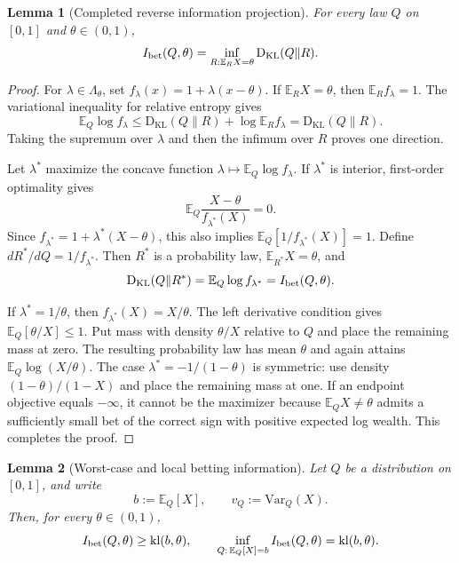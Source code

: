 \documentclass[12pt]{article}
\theoremstyle{spaced}
\newtheorem{lemma}[lemma]{Lemma}
\theoremstyle{remark}
\newcommand{\E}{\mathbb E}
\newcommand{\KL}{\mathrm{D}_{\text{KL}}}
\newcommand{\kl}{\mathrm{kl}}
\begin{document}
\label{app:bounded-UP-information}
\begin{lemma}[Completed reverse information projection]
\label{lem:UP-ripr}
For every law $Q$ on $[0,1]$ and $\theta\in(0,1)$,
\[
 I_{\rm bet}(Q,\theta)
 =\inf_{R:\E_RX=\theta}\KL(Q\|R).
\]
\end{lemma}
\begin{proof}
For $\lambda\in\Lambda_\theta$, set
$f_\lambda(x)=1+\lambda(x-\theta)$.  If $\E_RX=\theta$, then
$\E_Rf_\lambda=1$.  The variational inequality for relative entropy gives
\[
 \E_Q\log f_\lambda
 \le\KL(Q\|R)+\log\E_Rf_\lambda
 =\KL(Q\|R).
\]
Taking the supremum over $\lambda$ and then the infimum over $R$ proves one
direction.

Let $\lambda^*$ maximize the concave function
$\lambda\mapsto\E_Q\log f_\lambda$.  If $\lambda^*$ is interior, first-order
optimality gives
\[
 \E_Q\frac{X-\theta}{f_{\lambda^*}(X)}=0.
\]
Since $f_{\lambda^*}=1+\lambda^*(X-\theta)$, this also implies
$\E_Q[1/f_{\lambda^*}(X)]=1$.  Define
$dR^*/dQ=1/f_{\lambda^*}$.  Then $R^*$ is a probability law,
$\E_{R^*}X=\theta$, and
\[
 \KL(Q\|R^*)=\E_Q\log f_{\lambda^*}=I_{\rm bet}(Q,\theta).
\]

If $\lambda^*=1/\theta$, then
$f_{\lambda^*}(X)=X/\theta$.  The left derivative condition gives
$\E_Q[\theta/X]\le1$.  Put mass with density $\theta/X$ relative to $Q$ and
place the remaining mass at zero.  The resulting probability law has mean
$\theta$ and again attains
$\E_Q\log(X/\theta)$.  The case
$\lambda^*=-1/(1-\theta)$ is symmetric: use density
$(1-\theta)/(1-X)$ and place the remaining mass at one.  If an endpoint
objective equals $-\infty$, it cannot be the maximizer because
$\E_QX\ne\theta$ admits a sufficiently small bet of the correct sign with
positive expected log wealth.  This completes the proof.
\end{proof}



\begin{lemma}[Worst-case and local betting information]
\label{lem:UP-minimax-local}
Let \(Q\) be a distribution on \([0,1]\), and write
\[
    b:=\E_Q[X],
    \qquad
    v_Q:=\text{Var}_Q(X).
\]
Then, for every \(\theta\in(0,1)\),
\[
    I_{\rm bet}(Q,\theta)\ge \kl(b,\theta),
    \qquad
    \inf_{Q:\,\E_Q[X]=b} I_{\rm bet}(Q,\theta)
    =
    \kl(b,\theta).
\]
\end{lemma}
\end{document}
